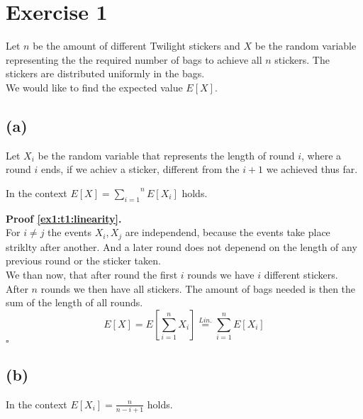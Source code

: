 \section*{Exercise 1} 

Let $n$ be the amount of different Twilight stickers and $X$ be the random variable representing the the required number of bags to achieve all $n$ stickers.
The stickers are distributed uniformly in the bags.\\
We would like to find the expected value $E[X]$.


\subsection*{(a)}

Let $X_i$ be the random variable that represents the length of round $i$, where a round $i$ ends, if we achiev a sticker, different from the $i+1$ we
achieved thus far.

\begin{lemma}\label{ex1:t1:linearity}
    In the context $E[X] = \overset{n}{\underset{i=1}{\sum}} E[X_i]$ holds.
\end{lemma}

\textbf{Proof \ref{ex1:t1:linearity}.}\\
For $i \not= j$ the events $X_i, X_j$ are independend, because the events take place striklty after another. And a later round does not
depenend on the length of any previous round or the sticker taken.\\
We than now, that after round the first $i$ rounds we have $i$ different stickers. After $n$ rounds we then have all stickers.
The amount of bags needed is then the sum of the length of all rounds.\\
$$
    E[X] = E \left[ \sum_{i=1}^{n} X_i \right] \stackrel{Lin.}{=} \sum_{i=1}^{n} E [X_i]
$$
\mbox{} \hfill $\square$



\subsection*{(b)}

\begin{lemma}\label{ex1:t1:rounds}
    In the context $E[X_i] = \frac{n}{n-i+1}$ holds.
\end{lemma}

